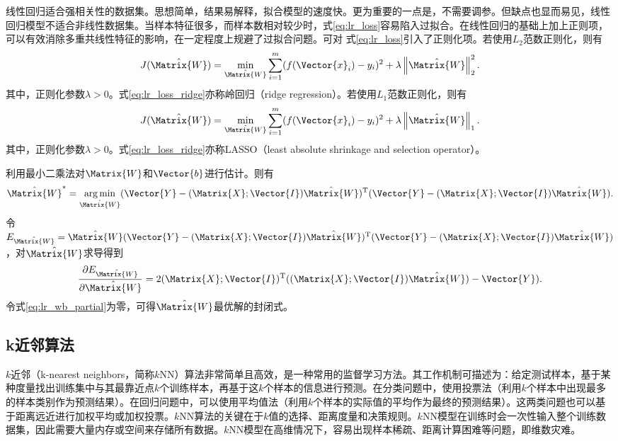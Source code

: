 线性回归适合强相关性的数据集。思想简单，结果易解释，拟合模型的速度快。更为重要的一点是，不需要调参。但缺点也显而易见，线性回归模型不适合非线性数据集。当样本特征很多，而样本数相对较少时，式\ref{eq:lr_loss}容易陷入过拟合。在线性回归的基础上加上正则项，可以有效消除多重共线性特征的影响，在一定程度上规避了过拟合问题。可对
式\ref{eq:lr_loss}引入了正则化项。若使用$L_2$范数正则化，则有
\begin{equation}
  \label{eq:lr_loss_ridge}
  J(\hat{\Matrix{W}})=\min_{\hat{\Matrix{W}}}\sum_{i=1}^{m}(f(\Vector{x}_i)-y_i)^2+\lambda\left\|\hat{\Matrix{W}}\right\|_2^2.
\end{equation}
其中，正则化参数$\lambda>0$。式\ref{eq:lr_loss_ridge}亦称岭回归（ridge regression）。若使用$L_1$范数正则化，则有
\begin{equation}
  \label{eq:lr_loss_lasso}
  J(\hat{\Matrix{W}})=\min_{\hat{\Matrix{W}}}\sum_{i=1}^{m}(f(\Vector{x}_i)-y_i)^2+\lambda\left\|\hat{\Matrix{W}}\right\|_1.
\end{equation}
其中，正则化参数$\lambda>0$。式\ref{eq:lr_loss_ridge}亦称LASSO（least absolute shrinkage and selection operator）。

利用最小二乘法对$\Matrix{W}$和$\Vector{b}$进行估计。则有
\begin{equation}
  \label{eq:lr_wb}
  \hat{\Matrix{W}}^*=\mathop{\arg\min}\limits_{\hat{\Matrix{W}}}(\Vector{Y}-(\Matrix{X};\Vector{I})\hat{\Matrix{W}})^{\text{T}}(\Vector{Y}-(\Matrix{X};\Vector{I})\hat{\Matrix{W}}).
\end{equation}
令$E_{\hat{\Matrix{W}}}={\hat{\Matrix{W}}}(\Vector{Y}-(\Matrix{X};\Vector{I})\hat{\Matrix{W}})^{\text{T}}(\Vector{Y}-(\Matrix{X};\Vector{I})\hat{\Matrix{W}})$，对$\hat{\Matrix{W}}$求导得到
\begin{equation}
  \label{eq:lr_wb_partial}
  \frac{\partial{E_{\hat{\Matrix{W}}}}}{\partial{\hat{\Matrix{W}}}}=2(\Matrix{X};\Vector{I})^{\text{T}}((\Matrix{X};\Vector{I})\hat{\Matrix{W}})-\Vector{Y}).
\end{equation}
令式\ref{eq:lr_wb_partial}为零，可得$\hat{\Matrix{W}}$最优解的封闭式。

\subsection{k近邻算法}\label{sec:k近邻算法}

$k$近邻（k-nearest neighbors，简称$k$NN）算法非常简单且高效，是一种常用的监督学习方法。其工作机制可描述为：给定测试样本，基于某种度量找出训练集中与其最靠近点$k$个训练样本，再基于这$k$个样本的信息进行预测。在分类问题中，使用投票法（利用$k$个样本中出现最多的样本类别作为预测结果）。在回归问题中，可以使用平均值法（利用$k$个样本的实际值的平均作为最终的预测结果）。这两类问题也可以基于距离远近进行加权平均或加权投票。$k$NN算法的关键在于$k$值的选择、距离度量和决策规则。$k$NN模型在训练时会一次性输入整个训练数据集，因此需要大量内存或空间来存储所有数据。$k$NN模型在高维情况下，容易出现样本稀疏、距离计算困难等问题，即维数灾难。

